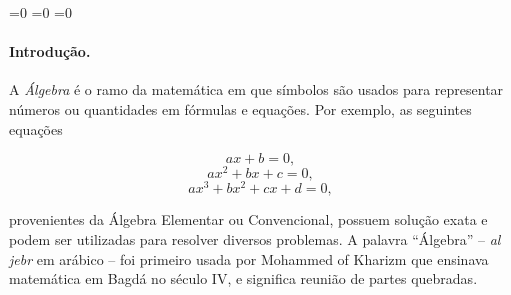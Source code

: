 \def\+{+}
\def\.{\cdot}
\def\~#1{\overline{#1}}
\def\<#1>{\langle#1\rangle}
=0
\def\exercise{\global\advance\count32 by1
{\medskip\noindent\bf Exercício \the\count32.~}}
=0
\def\axiom#1{\global\advance\count31 by1%
{\medskip\noindent\bf Axioma~\the\count31.~}}
=0
\def\theorem#1{\global\advance\count30 by1%
{\medskip\noindent\bf Teorema \the\count30.~}}
\def\proof{\smallskip\noindent{\it Prova.\/}}
\newenvironment{definition}[1][Definição]{\begin{trivlist}
\item[\hskip \labelsep {\bfseries #1}]}{\end{trivlist}}
\newenvironment{example}[1][Examplo]{\begin{trivlist}
\item[\hskip \labelsep {\bfseries #1}]}{\end{trivlist}}
\newenvironment{remark}[1][Remark]{\begin{trivlist}
\item[\hskip \labelsep {\bfseries #1}]}{\end{trivlist}}
\newcommand{\qed}{\nobreak \ifvmode \relax \else
      \ifdim\lastskip<1.5em \hskip-\lastskip
      \hskip1.5em plus0em minus0.5em \fi \nobreak
      \vrule height0.75em width0.5em depth0.25em\fi}

\paragraph{Introdução.}
A {\it Álgebra} é o ramo da matemática em que símbolos são usados para
representar números ou quantidades em fórmulas e equações. Por
exemplo, as seguintes equações

$$ax + b =0,$$
$$ax^2 + bx + c = 0,$$
$$ax^3 + bx^2 + cx + d = 0,$$

\noindent provenientes da Álgebra Elementar ou Convencional, possuem
solução exata e podem ser utilizadas para resolver diversos
problemas. A palavra ``Álgebra'' -- {\it al jebr} em arábico -- foi
primeiro usada por Mohammed of Kharizm que ensinava matemática em
Bagdá no século IV, e significa reunião de partes quebradas.

